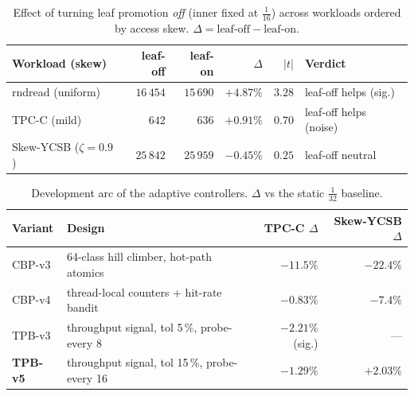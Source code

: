 \documentclass[10pt]{article}
\begin{document}
\begin{table}[h]
\centering\small
\caption{Effect of turning leaf promotion \emph{off} (inner fixed at
  $\tfrac{1}{16}$) across workloads ordered by access skew.
  $\Delta = \text{leaf-off} - \text{leaf-on}$.}
\label{tab:signflip}
\begin{tabular}{lrr rr l}
\toprule
Workload (skew) & leaf-off & leaf-on & $\Delta$ & $|t|$ & Verdict \\
\midrule
rndread (uniform)              & $16\,454$ & $15\,690$ & $\mathbf{+4.87\%}$ & $3.28$ & leaf-off helps (sig.) \\
TPC-C (mild)                   & $642$     & $636$     & $+0.91\%$          & $0.70$ & leaf-off helps (noise) \\
Skew-YCSB ($\zeta\!=\!0.9$)    & $25\,842$ & $25\,959$ & $-0.45\%$          & $0.25$ & leaf-off neutral \\
\bottomrule
\end{tabular}
\end{table}

\begin{table}[h]
\centering\small
\caption{Development arc of the adaptive controllers. $\Delta$ vs the static
  $\tfrac{1}{32}$ baseline.}
\label{tab:arc}
\begin{tabular}{llrr}
\toprule
Variant & Design & TPC-C $\Delta$ & Skew-YCSB $\Delta$ \\
\midrule
CBP-v3 & 64-class hill climber, hot-path atomics        & $-11.5\%$        & $-22.4\%$ \\
CBP-v4 & thread-local counters + hit-rate bandit        & $-0.83\%$        & $-7.4\%$ \\
TPB-v3 & throughput signal, tol 5\,\%, probe-every 8    & $-2.21\%$ (sig.) & --- \\
\textbf{TPB-v5} & throughput signal, tol 15\,\%, probe-every 16 & $\mathbf{-1.29\%}$ & $\mathbf{+2.03\%}$ \\
\bottomrule
\end{tabular}
\end{table}
\end{document}
